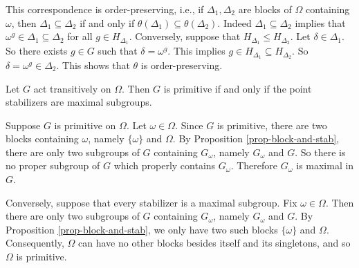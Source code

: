 \begin{remark}
	This correspondence is order-preserving, i.e., if $\Delta_1,\Delta_2$ are blocks of $\Omega$ containing $\omega$, then $\Delta_1\subseteq \Delta_2$ if and only if $\theta(\Delta_1)\subseteq \theta(\Delta_2)$. Indeed $\Delta_1\subseteq \Delta_2$ implies that $\omega^g \in \Delta_1\subseteq \Delta_2$ for all $g\in H_{\Delta_1}$. Conversely, suppose that $H_{\Delta_1}\leq H_{\Delta_2}$. Let $\delta\in \Delta_1$. So there exists $g\in G$ such that $\delta = \omega^g$. This implies $g\in H_{\Delta_1}\subseteq H_{\Delta_2}$. So $\delta = \omega^g \in \Delta_2$. This shows that $\theta$ is order-preserving.
\end{remark}

\begin{corollary} \label{cor-prim-iff-stab-is-max}
	Let $G$ act transitively on $\Omega$. Then $G$ is primitive if and only
	if the point stabilizers are maximal subgroups.
\end{corollary}
\begin{sketch}
	Suppose $G$ is primitive on $\Omega$. Let $\omega \in \Omega$.  Since $G$ is primitive, there are  two  blocks containing $\omega$, namely $\{\omega\}$ and $\Omega$.  By Proposition \ref{prop-block-and-stab}, there are only two subgroups of $G$ containing $G_\omega$, namely $G_\omega$ and $G$. So there is no proper subgroup of $G$ which properly contains $G_\omega$. Therefore $G_\omega$ is maximal in $G$.
	
	Conversely, suppose that every stabilizer is a maximal subgroup. Fix $\omega\in \Omega$. Then there are only two subgroups of $G$ containing $G_\omega$, namely $G_\omega$ and $G$. By Proposition \ref{prop-block-and-stab}, we only have two such blocks $\{\omega\}$ and $\Omega$.  Consequently, $\Omega$ can have no other blocks besides itself and its singletons, and so $\Omega$ is primitive.
\end{sketch}

